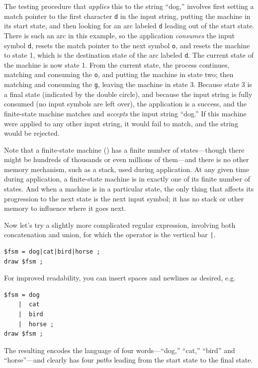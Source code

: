 The testing procedure that \emph{applies} this \fsm{} to the string ``dog,'' involves
first setting a match pointer to the first character \texttt{d} in the input string, 
putting the machine in
its start state, and then looking for an arc labeled \texttt{d} leading out of the
start state.  There is such an arc in this example, so the application 
\emph{consumes} the input symbol \texttt{d}, resets the match pointer to the next
symbol \texttt{o}, and resets
the machine to state 1,
which is the destination state of the arc labeled \texttt{d}.
The current
state of the machine is now state 1.  From the current state, the
process continues, matching and consuming the \texttt{o}, and putting the machine in
state two; then matching and consuming the \texttt{g}, leaving the machine in state 3.
Because state 3 is a final state (indicated by the double circle), and because the input 
string is fully consumed (no input symbols are left over), the
application is a success, and the finite-state machine matches and \emph{accepts} the input string
``dog.''  If this machine were applied to any other input string, it would fail to match, and the
string would be rejected.   

Note that a finite-state machine (\fsm{}) has a finite number of states---though there
might be hundreds of thousands or even millions of them---and there is no other memory
mechanism, such as a stack, used during application.  At any given time during
application, a finite-state machine is in exactly one of its finite number of states.
And when a machine is in a particular state, the only thing that affects its
progression
to the next state is the next input symbol; it has no stack or other memory to
influence where it goes next.

Now let's try a slightly more complicated regular expression, involving both
concatenation and union, for which the operator is the vertical bar \verb!|!. 

\begin{Verbatim}
$fsm = dog|cat|bird|horse ;
draw $fsm ;
\end{Verbatim}

\noindent
For improved readability, you can insert spaces and newlines as desired, e.g.

\begin{Verbatim}
$fsm = dog
    |  cat
    |  bird
    |  horse ;
draw $fsm ;
\end{Verbatim}

\noindent
The resulting \fsm{} encodes the language of four words---``dog,'' ``cat,'' ``bird''
and ``horse''---and clearly has four \emph{paths} leading from the start state to the
final state.


